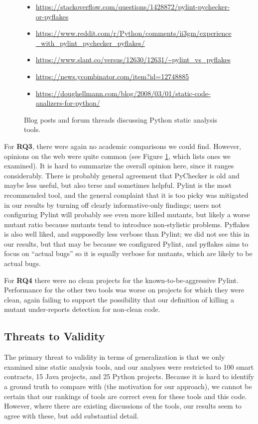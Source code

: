 \begin{figure}
  {\scriptsize
  \begin{itemize}
  \item \url{https://stackoverflow.com/questions/1428872/pylint-pychecker-or-pyflakes}
  \item \url{https://www.reddit.com/r/Python/comments/ii3gm/experience_with_pylint_pychecker_pyflakes/}
  \item \url{https://www.slant.co/versus/12630/12631/~pylint_vs_pyflakes}
  \item \url{https://news.ycombinator.com/item?id=12748885}
  \item \url{https://doughellmann.com/blog/2008/03/01/static-code-analizers-for-python/}
  \end{itemize}
  }
\caption{Blog posts and forum threads discussing Python static analysis tools.}
\label{fig:blogpython}
\end{figure}

For {\bf RQ3}, there were again no academic comparisons we could find.  However, opinions on the web were quite common (see Figure \ref{fig:blogpython}, which lists ones we examined).  It is hard to summarize the overall opinion here, since it ranges considerably.  There is probably general agreement that PyChecker is old and maybe less useful, but also terse and sometimes helpful.  Pylint is the most recommended tool, and the general complaint that it is too picky was mitigated in our results by turning off clearly informative-only findings; users not configuring Pylint will probably see even more killed mutants, but likely a worse mutant ratio because mutants tend to introduce non-stylistic problems.  Pyflakes is also well liked, and supposedly less verbose than Pylint; we did not see this in our results, but that may be because we configured Pylint, and pyflakes aims to focus on ``actual bugs'' so it is equally verbose for mutants, which are likely to be actual bugs.

For {\bf RQ4} there were no clean projects for the known-to-be-aggressive Pylint.  Performance for the other two tools was worse on projects for which they were clean, again failing to support the possibility that our definition of killing a mutant under-reports detection for non-clean code.

\subsection{Threats to Validity}

The primary threat to validity in terms of generalization is that we only examined nine static analysis tools, and our analyses were restricted to 100 smart contracts, 15 Java projects, and 25 Python projects.   Because it is hard to identify a ground truth to compare with (the motivation for our approach), we cannot be certain that our rankings of tools are correct even for these tools and this code.  However, where there are existing discussions of the tools, our results seem to agree with these, but add substantial detail.

